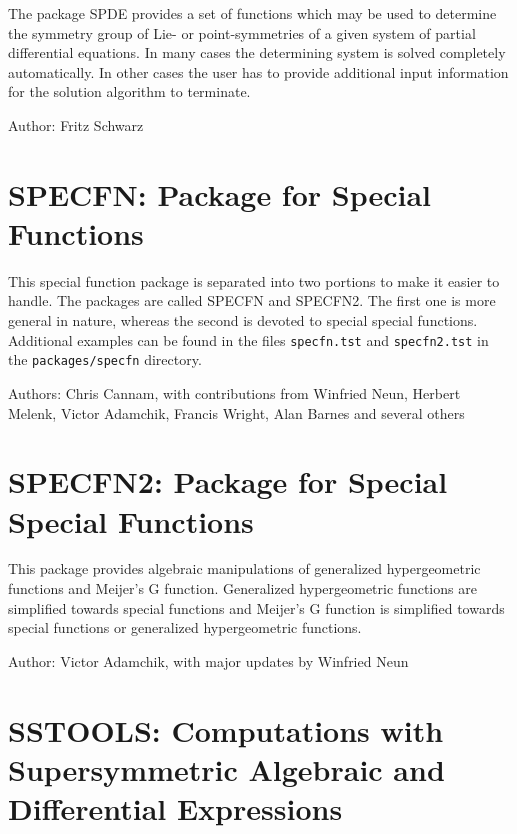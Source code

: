 The package SPDE provides a set of functions which may be used to
determine the symmetry group of Lie- or point-symmetries of a given system
of partial differential equations. In many cases the determining system is
solved completely automatically. In other cases the user has to provide
additional input information for the solution algorithm to terminate.

Author: Fritz Schwarz



\newpage

\section{SPECFN: Package for Special Functions}

This special function package is separated into two portions to make
it easier to handle.  The packages are called SPECFN and SPECFN2.  The
first one is more general in nature, whereas the second is devoted to
special special functions.  Additional examples can
be found in the files \texttt{specfn.tst} and
\texttt{specfn2.tst} in the \texttt{packages/specfn} directory.

Authors: Chris Cannam, with contributions from Winfried Neun, Herbert
Melenk, Victor Adamchik, Francis Wright, Alan Barnes and several others



\section{SPECFN2: Package for Special Special Functions}


This package provides algebraic manipulations of generalized
hypergeometric functions and Meijer's G function.  Generalized
hypergeometric functions are simplified towards special functions and
Meijer's G function is simplified towards special functions or generalized
hypergeometric functions.

Author: Victor Adamchik, with major updates by Winfried Neun



\newpage

\section{SSTOOLS: Computations with Supersymmetric Algebraic and Differential
Expressions}

